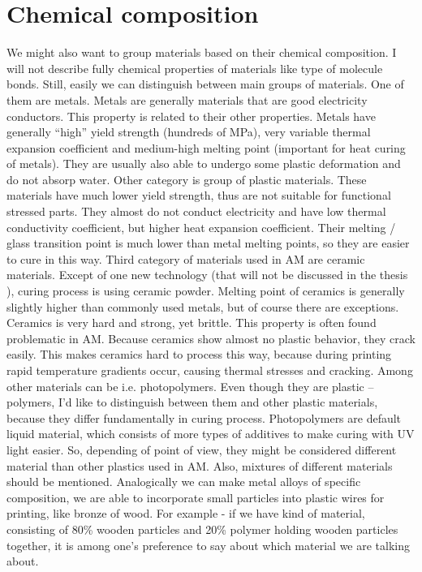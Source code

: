 \documentclass[a4paper]{report}
\begin{document}
\section{Chemical composition}
We might also want to group materials based on their chemical composition. I will not describe fully chemical properties of materials like type of molecule bonds. Still, easily we can distinguish between main groups of materials. One of them are metals. Metals are generally materials that are good electricity conductors. This property is related to their other properties. Metals have generally “high” yield strength (hundreds of MPa), very variable thermal expansion coefficient and medium-high melting point (important for heat curing of metals). They are usually also able to undergo some plastic deformation and do not absorp water.
Other category is group of plastic materials. These materials have much lower yield strength, thus are not suitable for functional stressed parts. They almost do not conduct electricity and have low thermal conductivity coefficient, but higher heat expansion coefficient. Their melting / glass transition point is much lower than metal melting points, so they are easier to cure in this way.
Third category of materials used in AM are ceramic materials. Except of one new technology (that will not be discussed in the thesis ), curing process is using ceramic powder. Melting point of ceramics is generally slightly higher than commonly used metals, but of course there are exceptions. Ceramics is very hard and strong, yet brittle. This property is often found problematic in AM. Because ceramics show almost no plastic behavior, they crack easily. This makes ceramics hard to process this way, because during printing rapid temperature gradients occur, causing thermal stresses and cracking.
Among other materials can be i.e. photopolymers. Even though they are plastic – polymers, I’d like to distinguish between them and other plastic materials, because they differ fundamentally in curing process. Photopolymers are default liquid material, which consists of more types of additives to make curing with UV light easier. So, depending of point of view, they might be considered different material than other plastics used in AM.
Also, mixtures of different materials should be mentioned. Analogically we can make metal alloys of specific composition, we are able to incorporate small particles into plastic wires for printing, like bronze of wood. For example - if we have kind of material, consisting of 80\% wooden particles and 20\% polymer holding wooden  particles together, it is among one’s preference to say about which material we are talking about.
\end{document}

